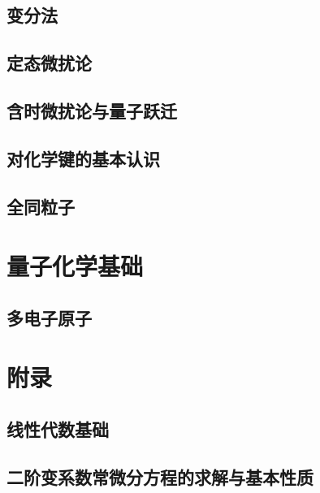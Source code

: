 \documentclass[cn,11pt,chinese,toc= twocol]{elegantbook}
\begin{document}
    


\chapter{变分法}

    
    
\chapter{定态微扰论}

    
    
\chapter{含时微扰论与量子跃迁}

 


\chapter{对化学键的基本认识}

    
    
\chapter{全同粒子}\label{chapter:identicalparticles}

 

\part{量子化学基础}

\chapter{多电子原子}
    

\appendix
\part{附录} 
\chapter{线性代数基础}
    
 
\chapter{二阶变系数常微分方程的求解与基本性质}
    
    
\end{document}
